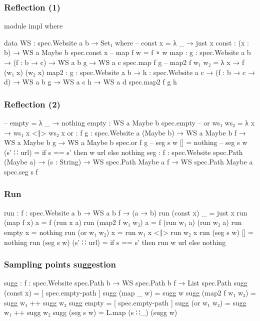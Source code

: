 \documentclass[aspectratio=169]{beamer}
\begin{document}
\begin{frame}
\frametitle{Reflection (1)}
\begin{code}
module impl where

  data WS : {spec.Website a b} → Set₁ where
    -- const x = λ _ → just x
    const : (x : b) → WS {a} {Maybe b} {spec.const x}
    -- map f w = f ∘ w
    map : {g : spec.Website a b} →
          (f : b → c) → WS {a} {b} {g} → WS {a} {c} {spec.map f g}
    -- map2 f w₁ w₂ = λ x → f (w₁ x) (w₂ x)
    map2 : {g : spec.Website a b} → {h : spec.Website a c}
           → (f : b → c → d)
           → WS {a} {b} {g}
           → WS {a} {c} {h}
           → WS {a} {d} {spec.map2 f g h}
\end{code}
\end{frame}

\begin{frame}
\frametitle{Reflection (2)}
\begin{code}
    -- empty = λ _ → nothing
    empty : WS {a} {Maybe b} {spec.empty}
    -- or ws₁ ws₂ = λ x → ws₁ x <∣> ws₂ x
    or : {f g : spec.Website a (Maybe b)}
         → WS {a} {Maybe b} {f}
         → WS {a} {Maybe b} {g}
         → WS {a} {Maybe b} {spec.or f g}
    -- seg s w [] = nothing
    -- seg s w (s' ∷ url) = if s == s' then w url else nothing
    seg : {f : spec.Website spec.Path (Maybe a)}
          → (s : String)
          → WS {spec.Path} {Maybe a} {f}
          → WS {spec.Path} {Maybe a} {spec.seg s f}
\end{code}
\end{frame}

\begin{frame}
\frametitle{Run}
\begin{code}
  run : {f : spec.Website a b} → WS {a} {b} {f} → (a → b)
  run (const x) _ = just x
  run (map f x) a = f (run x a)
  run (map2 f w₁ w₂) a = f (run w₁ a) (run w₂ a)
  run empty x = nothing
  run (or w₁ w₂) x = run w₁ x <∣> run w₂ x
  run (seg s w) [] = nothing
  run (seg s w) (s' ∷ url) = if s == s' then run w url else nothing
\end{code}
\end{frame}

\begin{frame}
\frametitle{Sampling points suggestion}
\begin{code}
  sugg : {f : spec.Website spec.Path b}
         → WS {spec.Path} {b} {f}
         → List spec.Path
  sugg (const x) = [ spec.empty-path ]
  sugg (map _ w) = sugg w
  sugg (map2 f w₁ w₂) = sugg w₁ ++ sugg w₂
  sugg empty = [ spec.empty-path ]
  sugg (or w₁ w₂) = sugg w₁ ++ sugg w₂
  sugg (seg s w) = L.map (s ∷_) (sugg w)
\end{code}
\end{frame}
\end{document}
